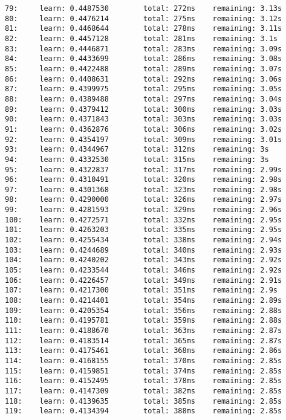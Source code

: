 \documentclass[11pt]{article}
\begin{document}
\begin{Verbatim}[commandchars=\\\{\}]
79:     learn: 0.4487530        total: 272ms    remaining: 3.13s
80:     learn: 0.4476214        total: 275ms    remaining: 3.12s
81:     learn: 0.4468644        total: 278ms    remaining: 3.11s
82:     learn: 0.4457128        total: 281ms    remaining: 3.1s
83:     learn: 0.4446871        total: 283ms    remaining: 3.09s
84:     learn: 0.4433699        total: 286ms    remaining: 3.08s
85:     learn: 0.4422488        total: 289ms    remaining: 3.07s
86:     learn: 0.4408631        total: 292ms    remaining: 3.06s
87:     learn: 0.4399975        total: 295ms    remaining: 3.05s
88:     learn: 0.4389488        total: 297ms    remaining: 3.04s
89:     learn: 0.4379412        total: 300ms    remaining: 3.03s
90:     learn: 0.4371843        total: 303ms    remaining: 3.03s
91:     learn: 0.4362876        total: 306ms    remaining: 3.02s
92:     learn: 0.4354197        total: 309ms    remaining: 3.01s
93:     learn: 0.4344967        total: 312ms    remaining: 3s
94:     learn: 0.4332530        total: 315ms    remaining: 3s
95:     learn: 0.4322837        total: 317ms    remaining: 2.99s
96:     learn: 0.4310491        total: 320ms    remaining: 2.98s
97:     learn: 0.4301368        total: 323ms    remaining: 2.98s
98:     learn: 0.4290000        total: 326ms    remaining: 2.97s
99:     learn: 0.4281593        total: 329ms    remaining: 2.96s
100:    learn: 0.4272571        total: 332ms    remaining: 2.95s
101:    learn: 0.4263203        total: 335ms    remaining: 2.95s
102:    learn: 0.4255434        total: 338ms    remaining: 2.94s
103:    learn: 0.4244689        total: 340ms    remaining: 2.93s
104:    learn: 0.4240202        total: 343ms    remaining: 2.92s
105:    learn: 0.4233544        total: 346ms    remaining: 2.92s
106:    learn: 0.4226457        total: 349ms    remaining: 2.91s
107:    learn: 0.4217300        total: 351ms    remaining: 2.9s
108:    learn: 0.4214401        total: 354ms    remaining: 2.89s
109:    learn: 0.4205354        total: 356ms    remaining: 2.88s
110:    learn: 0.4195781        total: 359ms    remaining: 2.88s
111:    learn: 0.4188670        total: 363ms    remaining: 2.87s
112:    learn: 0.4183514        total: 365ms    remaining: 2.87s
113:    learn: 0.4175461        total: 368ms    remaining: 2.86s
114:    learn: 0.4168155        total: 370ms    remaining: 2.85s
115:    learn: 0.4159851        total: 374ms    remaining: 2.85s
116:    learn: 0.4152495        total: 378ms    remaining: 2.85s
117:    learn: 0.4147309        total: 382ms    remaining: 2.85s
118:    learn: 0.4139635        total: 385ms    remaining: 2.85s
119:    learn: 0.4134394        total: 388ms    remaining: 2.85s

\end{Verbatim}
\end{document}
